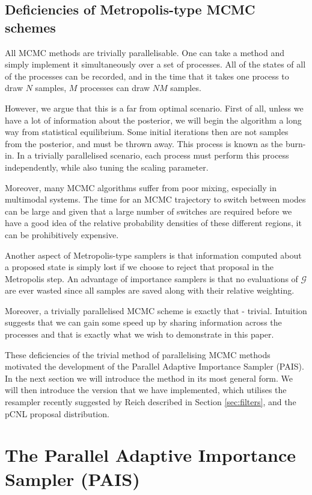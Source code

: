\documentclass[final]{siamltex}
\begin{document}
\subsection{Deficiencies of Metropolis-type MCMC schemes}
All MCMC methods are trivially parallelisable. One can take a method
and simply implement it simultaneously over a set of processes. All
of the states of all of the processes can be recorded, and in the time
that it takes one process to draw $N$ samples, $M$ processes can draw
$NM$ samples. 

However, we argue that this is a far from optimal
scenario. First of all, unless we have a lot of information about the posterior, we will begin the algorithm a long way from statistical equilibrium. Some initial iterations then are not samples from the posterior, and must be thrown away. This process is known as the burn-in. In a trivially parallelised scenario, each process must perform this process independently, while also tuning the scaling parameter.

Moreover, many MCMC algorithms suffer from poor mixing, especially in
multimodal systems. The time for an MCMC trajectory to switch between modes can be
large and given that a large number of switches are required before we have a
good idea of the relative probability densities of these different
regions, it can be prohibitively expensive.

Another aspect of Metropolis-type samplers is that information
computed about a proposed state is simply lost if we choose to reject
that proposal in the Metropolis step. An advantage of importance
samplers is that no evaluations of $\mathcal{G}$ are ever wasted
since all samples are saved along with their relative weighting.

Moreover, a trivially parallelised MCMC scheme is exactly that -
trivial. Intuition suggests that we can gain some speed up by sharing information across the processes and that is
exactly what we wish to demonstrate in this paper.

These deficiencies of the trivial method of parallelising MCMC methods
motivated the development of the Parallel Adaptive Importance Sampler
(PAIS). In the next section we will introduce the method in its most
general form. We will then introduce the version that we have
implemented, which utilises the resampler recently suggested by
Reich\cite{reich2013nonparametric} described in Section \ref{sec:filters}, and the pCNL proposal distribution.


\section{The Parallel Adaptive Importance Sampler \allowbreak (PAIS)}\label{sec:PAIS_alg}
\end{document}
